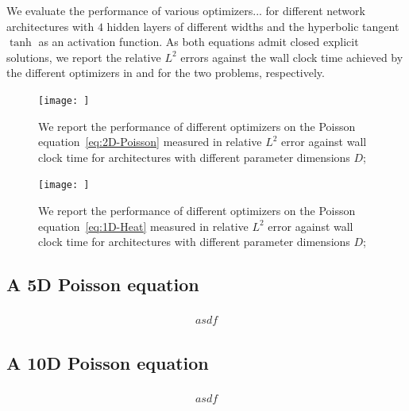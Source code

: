 We evaluate the performance of various optimizers... for different network architectures with $4$ hidden layers of different widths and the hyperbolic tangent $\tanh$ as an activation function. 
As both equations admit closed explicit solutions, we report the relative $L^2$ errors against the wall clock time achieved by the different optimizers in  and  for the two problems, respectively. 

\begin{figure}
    \centering
    \texttt{[image: ]}
    \caption{We report the performance of different optimizers on the Poisson equation~\eqref{eq:2D-Poisson} measured in relative $L^2$ error against wall clock time for architectures with different parameter dimensions $D$; }
    \label{fig:2D-Poisson}
\end{figure}

\begin{figure}
    \centering
    \texttt{[image: ]}
    \caption{We report the performance of different optimizers on the Poisson equation~\eqref{eq:1D-Heat} measured in relative $L^2$ error against wall clock time for architectures with different parameter dimensions $D$; }
    \label{fig:1D-heat}
\end{figure}


\subsection{A 5D Poisson equation}

\begin{align}
    \begin{split}
        asdf
    \end{split}
\end{align}

\subsection{A 10D Poisson equation}

\begin{align}
    \begin{split}
        asdf
    \end{split}
\end{align}


